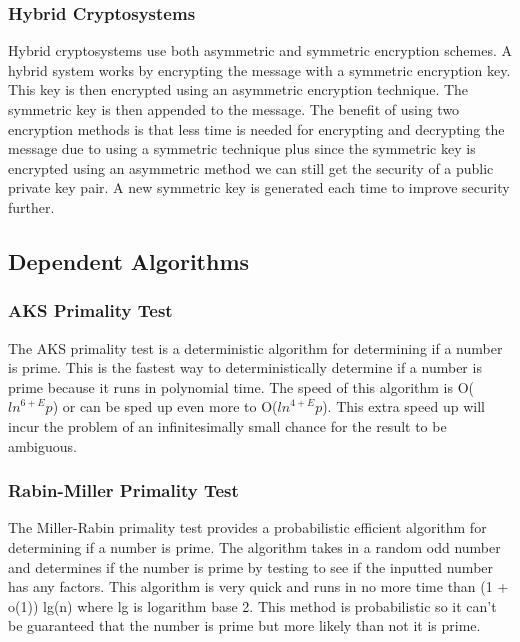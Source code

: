 \documentclass[conference]{IEEEtran}
\begin{document}
\subsubsection{Hybrid Cryptosystems}
Hybrid cryptosystems use both asymmetric and symmetric encryption schemes. A hybrid system works by encrypting the message with a symmetric encryption key. This key is then encrypted using an asymmetric encryption technique. The symmetric key is then appended to the message. The benefit of using two encryption methods is that less time is needed for encrypting and decrypting the message due to using a symmetric technique plus since the symmetric key is encrypted using an asymmetric method we can still get the security of a public private key pair. A new symmetric key is generated each time to improve security further.


\subsection{Dependent Algorithms}

\subsubsection{AKS Primality Test}
The AKS primality test is a deterministic algorithm for determining if a number is prime. This is the fastest way to deterministically determine if a number is prime because it runs in polynomial time. The speed of this algorithm is O(${ln}^{6 + E} p$) or can be sped up even more to O(${ln}^{4 + E} p$). This extra speed up will incur the problem of an infinitesimally small chance for the result to be ambiguous.

\subsubsection{Rabin-Miller Primality Test}
The Miller-Rabin primality test provides a probabilistic efficient algorithm for determining if a number is prime. The algorithm takes in a random odd number and determines if the number is prime by testing to see if the inputted number has any factors. This algorithm is very quick and runs in no more time than (1 + o(1)) lg(n) where lg is logarithm base 2. This method is probabilistic so it can't be guaranteed that the number is prime but more likely than not it is prime.
\end{document}
